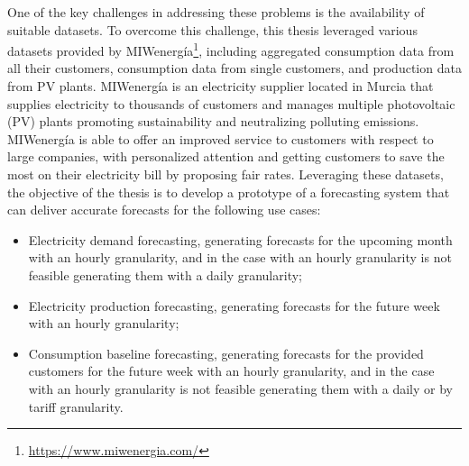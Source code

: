 One of the key challenges in addressing these problems is the availability of suitable datasets.
To overcome this challenge, this thesis leveraged various datasets provided by MIWenergía\footnote{ \url{https://www.miwenergia.com/} }, including aggregated consumption data from all their customers, consumption data from single customers, and production data from PV plants.
MIWenergía is an electricity supplier located in Murcia that supplies electricity to thousands of customers and manages multiple photovoltaic (PV) plants promoting sustainability and neutralizing polluting emissions.
MIWenergía is able to offer an improved service to customers with respect to large companies, with personalized attention and getting customers to save the most on their electricity bill by proposing fair rates.
Leveraging these datasets, the objective of the thesis is to develop a prototype of a forecasting system that can deliver accurate forecasts for the following use cases:
\begin{itemize}
  \item Electricity demand forecasting, generating forecasts for the upcoming month with an hourly granularity, and in the case with an hourly granularity is not feasible generating them with a daily granularity;
  \item Electricity production forecasting, generating forecasts for the future week with an hourly granularity;
  \item Consumption baseline forecasting, generating forecasts for the provided customers for the future week with an hourly granularity, and in the case with an hourly granularity is not feasible generating them with a daily or by tariff granularity.
\end{itemize}


